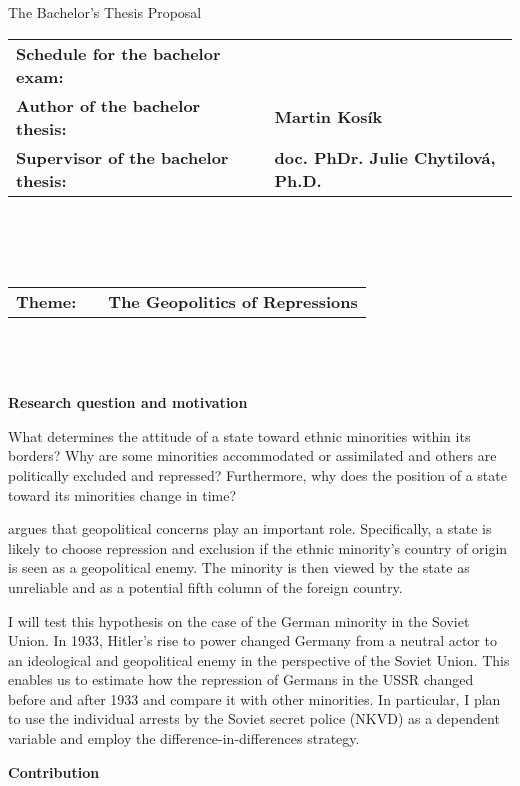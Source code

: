 \pagestyle{empty}
\begin{center}
\LARGE{The Bachelor’s Thesis Proposal}
\end{center}
\vspace{5mm}
\begin{tabular}{lcl}
\large{\bf Schedule for the bachelor exam:} & & \\
\large{\bf Author of the bachelor thesis:} & & \large{\bf Martin Kosík}\\
\large{\bf Supervisor of the bachelor thesis:} & & \large{\bf doc. PhDr. Julie Chytilová, Ph.D.}
\end{tabular}
\\
\\
\\
\begin{tabular}{lcl}
\large{\bf Theme:} & & \large{\bf The Geopolitics of Repressions}
\end{tabular}\\
\\
\\
\large{\bf Research question and motivation}

\noindent
What determines the attitude of a state toward ethnic minorities within its borders? Why are some minorities accommodated or assimilated and others are politically excluded and repressed? Furthermore, why does the position of a state toward its minorities change in time? 

\citet{mylonas_politics_2013} argues that geopolitical concerns play an important role. Specifically, a state is likely to choose repression and exclusion if the ethnic minority's country of origin is seen as a geopolitical enemy. The minority is then viewed by the state as unreliable and as a potential fifth column of the foreign country. 

I will test this hypothesis on the case of the German minority in the Soviet Union. In 1933, Hitler’s rise to power changed Germany from a neutral actor to an ideological and geopolitical enemy in the perspective of the Soviet Union. This enables us to estimate how the repression of Germans in the USSR changed before and after 1933 and compare it with other minorities. In particular, I plan to use the individual arrests by the Soviet secret police (NKVD) as a dependent variable and employ the difference-in-differences strategy. 

\noindent  \large{\bf Contribution}

